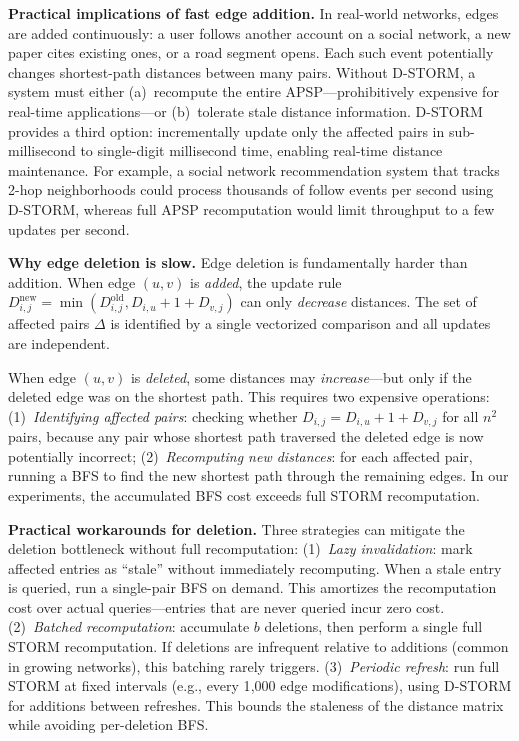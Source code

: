 \documentclass[journal]{IEEEtran}
\begin{document}
\textbf{Practical implications of fast edge addition.} In real-world networks, edges are added continuously: a user follows another account on a social network, a new paper cites existing ones, or a road segment opens. Each such event potentially changes shortest-path distances between many pairs. Without D-STORM, a system must either (a)~recompute the entire APSP---prohibitively expensive for real-time applications---or (b)~tolerate stale distance information. D-STORM provides a third option: incrementally update only the affected pairs in sub-millisecond to single-digit millisecond time, enabling real-time distance maintenance. For example, a social network recommendation system that tracks 2-hop neighborhoods could process thousands of follow events per second using D-STORM, whereas full APSP recomputation would limit throughput to a few updates per second.

\textbf{Why edge deletion is slow.} Edge deletion is fundamentally harder than addition. When edge $(u,v)$ is \emph{added}, the update rule $D_{i,j}^{\text{new}} = \min(D_{i,j}^{\text{old}}, D_{i,u}+1+D_{v,j})$ can only \emph{decrease} distances. The set of affected pairs $\Delta$ is identified by a single vectorized comparison and all updates are independent.

When edge $(u,v)$ is \emph{deleted}, some distances may \emph{increase}---but only if the deleted edge was on the shortest path. This requires two expensive operations: (1)~\emph{Identifying affected pairs}: checking whether $D_{i,j} = D_{i,u}+1+D_{v,j}$ for all $n^2$ pairs, because any pair whose shortest path traversed the deleted edge is now potentially incorrect; (2)~\emph{Recomputing new distances}: for each affected pair, running a BFS to find the new shortest path through the remaining edges. In our experiments, the accumulated BFS cost exceeds full STORM recomputation.

\textbf{Practical workarounds for deletion.} Three strategies can mitigate the deletion bottleneck without full recomputation: (1)~\emph{Lazy invalidation}: mark affected entries as ``stale'' without immediately recomputing. When a stale entry is queried, run a single-pair BFS on demand. This amortizes the recomputation cost over actual queries---entries that are never queried incur zero cost. (2)~\emph{Batched recomputation}: accumulate $b$ deletions, then perform a single full STORM recomputation. If deletions are infrequent relative to additions (common in growing networks), this batching rarely triggers. (3)~\emph{Periodic refresh}: run full STORM at fixed intervals (e.g., every 1{,}000 edge modifications), using D-STORM for additions between refreshes. This bounds the staleness of the distance matrix while avoiding per-deletion BFS.
\end{document}
